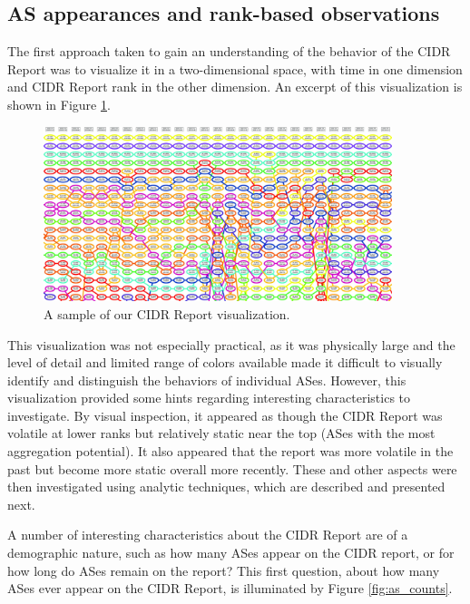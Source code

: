 \subsection{AS appearances and rank-based observations}
The first approach taken to gain an understanding of the behavior of the CIDR
Report was to visualize it in a two-dimensional space, with time in one
dimension and CIDR Report rank in the other dimension. An excerpt of this
visualization is shown in Figure \ref{fig:viz_sample}.

\begin{figure}[h!]
\begin{centering}
\begin{singlespace}
    \includegraphics[width=4in]{figures/viz_sample.jpg}
    \caption{A sample of our CIDR Report visualization.}
    \label{fig:viz_sample}
\end{singlespace}
\end{centering}
\end{figure}

This visualization was not especially practical, as it was physically large and
the level of detail and limited range of colors available made it difficult to
visually identify and distinguish the behaviors of individual ASes. However,
this visualization provided some hints regarding interesting characteristics to
investigate. By visual inspection, it appeared as though the CIDR Report was
volatile at lower ranks but relatively static near the top (ASes with the most
aggregation potential). It also appeared that the report was more volatile in
the past but become more static overall more recently. These and other aspects
were then investigated using analytic techniques, which are described and
presented next.

A number of interesting characteristics about the CIDR Report are of a
demographic nature, such as how many ASes appear on the CIDR report, or for how
long do ASes remain on the report? This first question, about how many ASes
ever appear on the CIDR Report, is illuminated by Figure \ref{fig:as_counts}.

